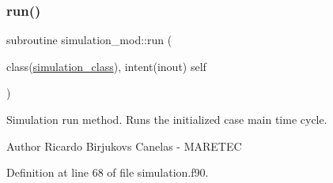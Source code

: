\subsubsection{\texorpdfstring{run()}{run()}}
{\footnotesize\ttfamily subroutine simulation\+\_\+mod\+::run (\begin{DoxyParamCaption}\item[{class(\mbox{\hyperlink{structsimulation__mod_1_1simulation__class}{simulation\+\_\+class}}), intent(inout)}]{self }\end{DoxyParamCaption})\hspace{0.3cm}{\ttfamily [private]}}



Simulation run method. Runs the initialized case main time cycle. 

\begin{DoxyAuthor}{Author}
Ricardo Birjukovs Canelas -\/ M\+A\+R\+E\+T\+EC 
\end{DoxyAuthor}


Definition at line 68 of file simulation.\+f90.



